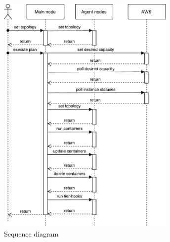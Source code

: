 \begin{figure}[ht]
  \centering
    \includegraphics[height=450px,natwidth=433,natheight=593]{./pictures/sequence}
    \caption{Sequence diagram}
\end{figure}
